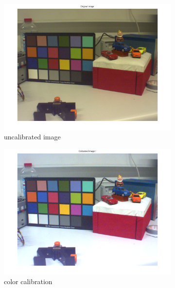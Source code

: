 \documentclass[
a4paper,     %
11pt         %
]{scrartcl}  %
\begin{document}
\begin{figure}[ht!]
\centering
\begin{subfigure}{0.49\textwidth}
  \centering
  \includegraphics[width=\textwidth]{./Bildg_Messtechnik_Lab/ColorCalibration/html/color_calibration_01.png}
  \caption{uncalibrated image}
\end{subfigure}%
\begin{subfigure}{0.49\textwidth}
  \centering
  \includegraphics[width=\textwidth]{./Bildg_Messtechnik_Lab/ColorCalibration/html/color_calibration_02.png}
  \caption{color calibration} \label{fig:colCal_pict1}
\end{subfigure}\\
\begin{subfigure}{0.49\textwidth}

\end{subfigure}
\end{figure}
\end{document}
